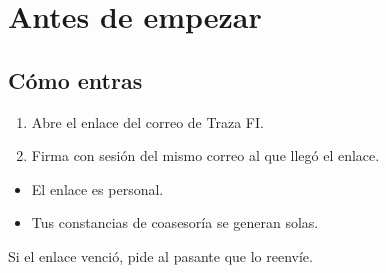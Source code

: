 \section{Antes de empezar}
\subsection*{Cómo entras}
\begin{enumerate}
  \item Abre el enlace del correo de Traza FI.
  \item Firma con sesión del mismo correo al que llegó el enlace.
\end{enumerate}
\begin{tencuenta}
\begin{itemize}
  \item El enlace es personal.
  \item Tus constancias de coasesoría se generan solas.
\end{itemize}
\end{tencuenta}
\begin{algosalemal}
Si el enlace venció, pide al pasante que lo reenvíe.
\end{algosalemal}
